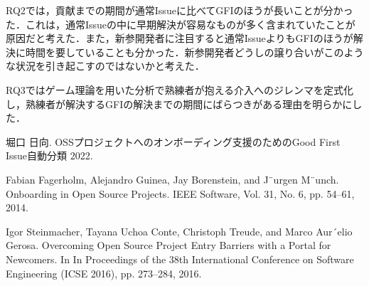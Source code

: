 \documentclass[twocolumn]{jarticle} %
\begin{document}
RQ2では，貢献までの期間が通常Issueに比べてGFIのほうが長いことが分かった．これは，通常Issueの中に早期解決が容易なものが多く含まれていたことが原因だと考えた．また，新参開発者に注目すると通常IssueよりもGFIのほうが解決に時間を要していることも分かった．新参開発者どうしの譲り合いがこのような状況を引き起こすのではないかと考えた．

RQ3ではゲーム理論を用いた分析で熟練者が抱える介入へのジレンマを定式化し，熟練者が解決するGFIの解決までの期間にばらつきがある理由を明らかにした．





\begin{thebibliography}{99}

    堀口 日向. OSSプロジェクトへのオンボーディング支援のためのGood First Issue自動分類 2022.

Fabian Fagerholm, Alejandro Guinea, Jay Borenstein, and J¨urgen M¨unch. Onboarding in
Open Source Projects. IEEE Software, Vol. 31, No. 6, pp. 54–61, 2014.

 Igor Steinmacher, Tayana Uchoa Conte, Christoph Treude, and Marco Aur´elio Gerosa.
Overcoming Open Source Project Entry Barriers with a Portal for Newcomers. In In
Proceedings of the 38th International Conference on Software Engineering (ICSE 2016),
pp. 273–284, 2016.

\end{thebibliography}

\end{document}
